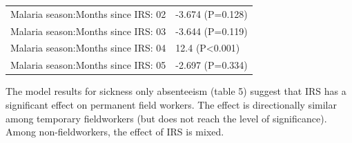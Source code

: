 \documentclass[]{article}
\begin{document}
\begin{longtable}[t]{ll}
\hspace{1em}Malaria season:Months since IRS: 02 & -3.674 (P=0.128)\\
\hspace{1em}Malaria season:Months since IRS: 03 & -3.644 (P=0.119)\\
\hspace{1em}Malaria season:Months since IRS: 04 & 12.4 (P<0.001)\\
\hspace{1em}Malaria season:Months since IRS: 05 & -2.697 (P=0.334)\\*
\end{longtable}

The model results for sickness only absenteeism (table 5) suggest that
IRS has a significant effect on permanent field workers. The effect is
directionally similar among temporary fieldworkers (but does not reach
the level of significance). Among non-fieldworkers, the effect of IRS is
mixed.
\end{document}
